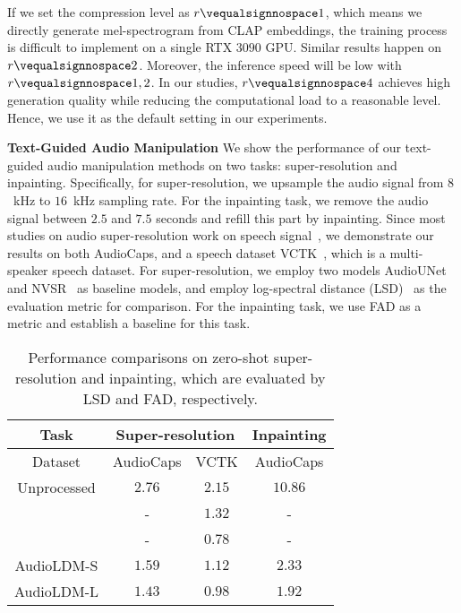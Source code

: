 If we set the compression level as $r\vequalsignnospace1$, which means we directly generate mel-spectrogram from CLAP embeddings, the training process is difficult to implement on a single RTX $3090$ GPU. Similar results happen on $r\vequalsignnospace2$. Moreover, the inference speed will be low with $r\vequalsignnospace1,2$. In our studies, $r\vequalsignnospace4$ achieves high generation quality while reducing the computational load to a reasonable level. Hence, we use it as the default setting in our experiments.

\textbf{Text-Guided Audio Manipulation} We show the performance of our text-guided audio manipulation methods on two tasks: super-resolution and inpainting. Specifically, for super-resolution, we upsample the audio signal from $8$~kHz to $16$~kHz sampling rate. For the inpainting task, we remove the audio signal between $2.5$ and $7.5$ seconds and refill this part by inpainting. Since most studies on audio super-resolution work on speech signal~\cite{liu2021voicefixer, liu2022neural}, we demonstrate our results on both AudioCaps, and a speech dataset VCTK~\cite{vctk-yamagishi2019cstr}, which is a multi-speaker speech dataset. For super-resolution, we employ two models AudioUNet~\cite{kuleshov2017audio} and NVSR~\cite{liu2022neural} as baseline models, and employ log-spectral distance (LSD)~\cite{heming-towards-sr-wang2021towards} as the evaluation metric for comparison. For the inpainting task, we use FAD as a metric and establish a baseline for this task. 
\begin{table}[tbp]
\centering
\small
\begin{tabular}{cccc}
\toprule
Task          & \multicolumn{2}{c}{Super-resolution}  &  Inpainting     \\
\midrule
Dataset       & AudioCaps            & VCTK                 & AudioCaps            \\
\midrule
Unprocessed   &          $2.76$            &      $2.15$                &   $10.86$                   \\
\citet{kuleshov2017audio}     & -                    & $1.32$                 & -                    \\
\citet{liu2022neural}          & -                    & $\mathbf{0.78}$                 & -                    \\
AudioLDM-S &         $1.59$             &     $1.12$                 &   $2.33$                   \\
AudioLDM-L & $\mathbf{1.43}$ & $0.98$ & $\mathbf{1.92}$ \\
\bottomrule
\end{tabular}
\caption{Performance comparisons on zero-shot super-resolution and inpainting, which are evaluated by LSD and FAD, respectively.}
\label{tab: audiomanipulation}
\end{table}
